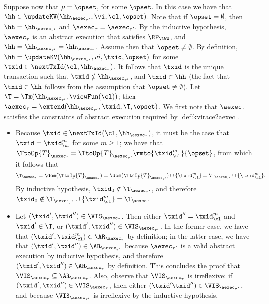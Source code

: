 \begin{itemize}
Suppose now that $\mu = \opset$, for some $\opset$. In this case we have that  
$\hh \in \updateKV(\hh_{\aexec_{\tau'}}, \vi, \cl, \opset)$. Note that if 
$\opset = \emptyset$, then $\hh = \hh_{\aexec_{\tau'}}$ and $\aexec_{\tau} = \aexec_{\tau'}$. 
By the inductive hypothesis, $\aexec_{\tau}$ is an abstract execution that satisfies 
$\RP_{\LWW}$, and $\hh = \hh_{\aexec_{\tau'}} = \hh_{\aexec_{\tau}}$. 
Assume then that $\opset \neq \emptyset$. By definition, $\hh = \updateKV(\hh_{\aexec_{\tau'}}, 
vi, \txid, \opset)$ for some $\txid \in \nextTxId(\cl, \hh_{\aexec_{\tau}})$. It follows that $\txid$ 
is the unique transaction such that $\txid \notin \hh_{\aexec_{\tau'}}$, and $\txid \in \hh$ 
(the fact that $\txid \in \hh$ follows from the assumption that $\opset \neq \emptyset$). Let 
$\T = \Tx(\hh_{\aexec_{\tau'}}, \viewFun(\cl))$; then $\aexec_{\tau} = \extend(\hh_{\aexec_{\tau'}}, \txid, \T, \opset)$. 
We first note that $\aexec_{\tau}$ satisfies the constraints of abstract execution required by \cref{def:kvtrace2aexec}.
\begin{itemize}
\item  Because $\txid \in \nextTxId(\cl, \hh_{\aexec_{\tau}})$, it must be the case that $\txid = \txid_{\cl}^{m}$ for some 
$m \geq 1$; we have that $\TtoOp{T}_{\aexec_{\tau}} = \TtoOp{T}_{\aexec_{\tau'}}\rmto{\txid_{\cl}^{m}}{\opset}$, 
from which it follows that 
\[
\T_{\aexec_{\tau}} = \dom(\TtoOp{T}_{\aexec_{\tau}}) = \dom(\TtoOp{T}_{\aexec_{\tau'}}) \cup 
\{\txid_{\cl}^{m} \} = \T_{\aexec_{\tau'}} \cup \{\txid_{\cl}^{m} \}.
\]
By inductive hypothesis, $\txid_0 \notin \T_{\aexec_{\tau'}}$, and therefore $\txid_{0} \notin 
\T_{\aexec_{\tau'}} \cup \{\txid_{\cl}^{m} \} = \T_{\aexec}$.
\item Let $(\txid' ,\txid'') \in \VIS_{\aexec_{\tau}}$. Then either $\txid'' = \txid_{\cl}^{m}$ and $\txid' \in \T$, or $(\txid', \txid'') \in 
\VIS_{\aexec_{\tau'}}$. In the former case, we have that $(\txid', \txid_{\cl}^{m}) \in \AR_{\aexec_{\tau}}$ by definition; 
in the latter case, we have that $(\txid', \txid'') \in \AR_{\aexec_{\tau'}}$ because $\aexec_{\tau'}$ is a valid 
abstract execution by inductive hypothesis, and therefore $(\txid', \txid'') \in \AR_{\aexec_{\tau}}$ by definition. 
This concludes the proof that $\VIS_{\aexec_{\tau}} \subseteq \AR_{\aexec_{\tau}}$. 
Also, observe that $\VIS_{\aexec_{\tau}}$ is irreflexive: if $(\txid', \txid'') \in \VIS_{\aexec_{\tau}}$, then either 
$(\txid' \txid'') \in \VIS_{\aexec_{\tau'}}$, and because $\VIS_{\aexec_{\tau'}}$ is irreflexive by the inductive hypothesis, 

\end{itemize}
\end{itemize}
